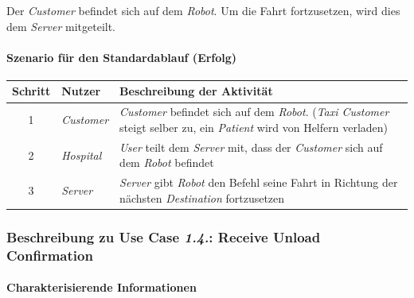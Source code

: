 				Der \emph{Customer} befindet sich auf dem \emph{Robot}. Um die Fahrt fortzusetzen, wird dies dem \emph{Server} mitgeteilt.
					\paragraph*{Szenario für den Standardablauf (Erfolg)}
	
				\begin{table}[H]
					\centering
					\begin{tabularx}{\textwidth}{|c|p{2cm}|X|}
					\hline
					Schritt & Nutzer & Beschreibung der Aktivität \\ \hline
					1 & \emph{Customer} & \emph{Customer} befindet sich auf dem \emph{Robot}. (\emph{Taxi Customer} steigt selber zu, ein \emph{Patient} wird von Helfern verladen) \\
					2 & \emph{Hospital} & \emph{User} teilt dem \emph{Server} mit, dass der \emph{Customer} sich auf dem \emph{Robot} befindet \\
					3 & \emph{Server} & \emph{Server} gibt \emph{Robot} den Befehl seine Fahrt in Richtung der nächsten \emph{Destination} fortzusetzen \\
					\hline
					\end{tabularx}
				\end{table}
				
				
			
		
			\subsubsection{Beschreibung zu Use Case \emph{1.4.}: Receive Unload Confirmation}
				\paragraph*{Charakterisierende Informationen}
				
